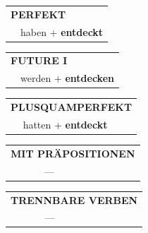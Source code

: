 \documentclass[10pt,a4paper]{revtex4-2}
\begin{document}
\begin{verbbox-acc}
\vspace{10pt}

\begin{tabular}{rl}
\multicolumn{2}{l}{\textbf{PERFEKT}}\\
& haben + \textbf{entdeckt}\\
\end{tabular}
\hfill
\begin{tabular}{rl}
\multicolumn{2}{l}{\textbf{FUTURE I}}\\
& werden + \textbf{entdecken}\\
\end{tabular}
\hfill
\begin{tabular}{rl}
\multicolumn{2}{l}{\textbf{PLUSQUAMPERFEKT}}\\
& hatten + \textbf{entdeckt}\\
\end{tabular}

\vspace{10pt}

\begin{tabular}{lll}
\multicolumn{3}{l}{\textbf{MIT PRÄPOSITIONEN}}\\
& ---\\
\end{tabular}
\hfill
\begin{tabular}{lll}
\multicolumn{3}{l}{\textbf{TRENNBARE VERBEN}}\\
& ---\\
\end{tabular}

\vspace{-5pt}
\end{verbbox-acc}
\end{document}
